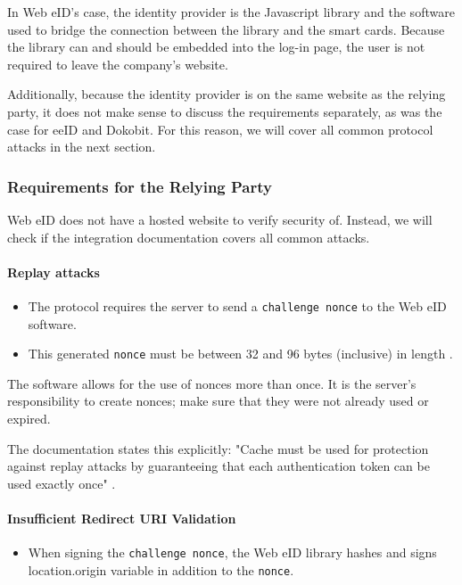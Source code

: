 In Web eID's case, the identity provider is the Javascript library and the software used to bridge the connection between the library and the smart cards. Because the library can and should be embedded into the log-in page, the user is not required to leave the company's website.

Additionally, because the identity provider is on the same website as the relying party, it does not make sense to discuss the requirements separately, as was the case for eeID and Dokobit. For this reason, we will cover all common protocol attacks in the next section.

\subsubsection{Requirements for the Relying Party}

Web eID does not have a hosted website to verify security of. Instead, we will check if the integration documentation covers all common attacks.

\paragraph{Replay attacks}

\begin{itemize}
  \item The protocol requires the server to send a \texttt{challenge nonce} to the Web eID software.
  \item This generated \texttt{nonce} must be between 32 and 96 bytes (inclusive) in length \cite{ria-webeid-source-web-eid-app-authenticate}.
\end{itemize}

The software allows for the use of nonces more than once. It is the server's responsibility to create nonces; make sure that they were not already used or expired.

The documentation states this explicitly: "Cache must be used for protection against replay attacks by guaranteeing that each authentication token can be used exactly once" \cite{ria-webeid-source-web-eid-authtoken-validation-java-readme}.

\paragraph{Insufficient Redirect URI Validation}

\begin{itemize}
  \item When signing the \texttt{challenge nonce}, the Web eID library hashes and signs {location.origin} variable in addition to the \texttt{nonce}.
\end{itemize}


